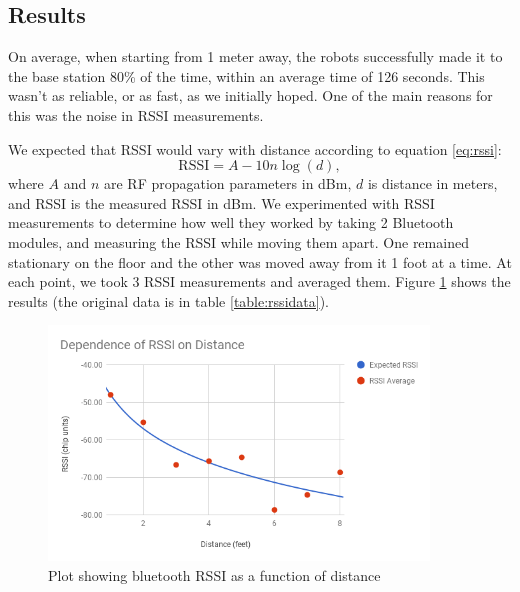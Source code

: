 \documentclass[]{article}
\begin{document}
\subsection{Results}

On average, when starting from 1 meter away, the robots successfully made it to the base station 80\% of the time,
within an average time of 126 seconds.
This wasn't as reliable, or as fast, as we initially hoped.
One of the main reasons for this was the noise in RSSI measurements.

We expected that RSSI would vary with distance according to equation \ref{eq:rssi}:
\begin{equation} \label{eq:rssi}
  \text{RSSI} = A - 10 n \log(d),
\end{equation}
where $A$ and $n$ are RF propagation parameters in dBm, $d$ is distance in meters, and RSSI is the measured RSSI in dBm. \cite{5415423}
We experimented with RSSI measurements to determine how well they worked by taking 2 Bluetooth modules, and measuring the RSSI while moving them apart.
One remained stationary on the floor and the other was moved away from it 1 foot at a time.
At each point, we took 3 RSSI measurements and averaged them. Figure \ref{fig:rssiplot} shows the results (the original data is in table \ref{table:rssidata}).

\begin{figure}
  \centering
  \includegraphics[width=0.9\textwidth]{rssi-chart.png}
  \caption{Plot showing bluetooth RSSI as a function of distance}
  \label{fig:rssiplot}
\end{figure}
\end{document}
